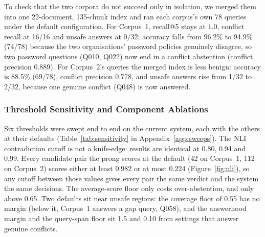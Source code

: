\documentclass[conference]{IEEEtran}
\begin{document}
To check that the two corpora do not succeed only in isolation, we merged
them into one 22-document, 135-chunk index and ran each corpus's own 78
queries under the default configuration. For Corpus~1, recall@5 stays at
$1.0$, conflict recall at 16/16 and unsafe answers at 0/32; accuracy falls
from 96.2\% to 94.9\% (74/78) because the two organisations' password
policies genuinely disagree, so two password questions (Q010, Q022) now end
in a conflict abstention (conflict precision $0.889$). For Corpus~2's
queries the merged index is less benign: accuracy is 88.5\% (69/78),
conflict precision $0.778$, and unsafe answers rise from 1/32 to 2/32,
because one genuine conflict (Q048) is now answered.

\subsubsection{Threshold Sensitivity and Component Ablations}
\label{sec:sensitivity}

Six thresholds were swept end to end on the current system, each with the
others at their defaults (Table~\ref{tab:sensitivity} in
Appendix~\ref{app:sweeps}). The NLI
contradiction cutoff is not a knife-edge: results are identical at 0.80,
0.94 and 0.99. Every candidate pair the prong scores at the default (42 on
Corpus~1, 112 on Corpus~2) scores either at least 0.982 or at most 0.224
(Figure~\ref{fig:nli}), so any cutoff between those values gives every pair
the same verdict and the system the same decisions. The average-score floor only costs
over-abstention, and only above 0.65. Two defaults sit near unsafe regions:
the coverage floor of 0.55 has no margin (below it, Corpus~1 answers a gap
query, Q058), and the answerhood margin and the query-span floor sit 1.5
and 0.10 from settings that answer genuine conflicts.
\end{document}
